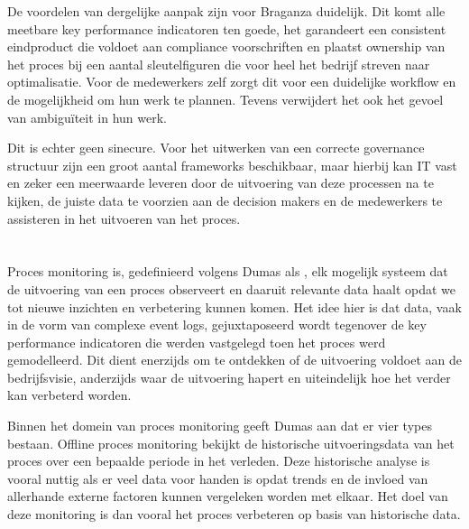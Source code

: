 De voordelen van dergelijke aanpak zijn voor Braganza \autocite[p. 7]{Braganza2000} duidelijk. Dit komt alle meetbare key performance indicatoren ten goede, het garandeert een consistent eindproduct die voldoet aan compliance voorschriften en plaatst ownership van het proces bij een aantal sleutelfiguren die voor heel het bedrijf streven naar optimalisatie. Voor de medewerkers zelf zorgt dit voor een duidelijke workflow en de mogelijkheid om hun werk te plannen. Tevens verwijdert het ook het gevoel van ambiguïteit in hun werk.\newline

Dit is echter geen sinecure. Voor het uitwerken van een correcte governance structuur zijn een groot aantal frameworks beschikbaar, maar hierbij kan IT vast en zeker een meerwaarde leveren door de uitvoering van deze processen na te kijken, de juiste data te voorzien aan de decision makers en de medewerkers te assisteren in het uitvoeren van het proces. \newline

\section{}%
\label{sec:proces monitoring}
Proces monitoring is, gedefinieerd volgens Dumas als \autocite[pp. 413-414]{Dumas2018}, elk mogelijk systeem dat de uitvoering van een proces observeert en daaruit relevante data haalt opdat we tot nieuwe inzichten en verbetering kunnen komen. Het idee hier is dat data, vaak in de vorm van complexe event logs, gejuxtaposeerd wordt tegenover de key performance indicatoren die werden vastgelegd toen het proces werd gemodelleerd. Dit dient enerzijds om te ontdekken of de uitvoering voldoet aan de bedrijfsvisie, anderzijds waar de uitvoering hapert en uiteindelijk hoe het verder kan verbeterd worden. \newline

Binnen het domein van proces monitoring geeft Dumas aan dat er vier types \autocite[pp. 414-415]{Dumas2018} bestaan. Offline proces monitoring bekijkt de historische uitvoeringsdata van het proces over een bepaalde periode in het verleden. Deze historische analyse is vooral nuttig als er veel data voor handen is opdat trends en de invloed van allerhande externe factoren kunnen vergeleken worden met elkaar. Het doel van deze monitoring is dan vooral het proces verbeteren op basis van historische data. \newline

